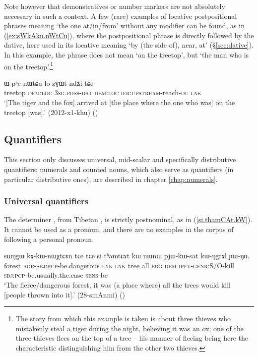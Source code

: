 Note however that demonstratives or number markers are not absolutely necessary in such a context. A few (rare) examples of locative postpositional phrases meaning `the one at/in/from' without any modifier can be found, as in (\ref{ex:sWkAku.nWtCu}), where the postpositional phrase is directly followed by the dative, here used in its locative meaning `by (the side of), near, at' (§\ref{sec:dative}). In this example, the phrase  does not mean `on the treetop', but `the man who is on the treetop'.\footnote{The story from which this example is taken is about three thieves who mistakenly steal a tiger during the night, believing it was an ox; one of the three thieves flees on the top of a tree -- his manner of fleeing being here the characteristic distinguishing him from the other two thieves.}

\begin{exe}
\ex \label{ex:sWkAku.nWtCu}
 ɯ-pʰe nɯtɕu lo-zɣɯt-ndʑi tɕe\\
treetop \textsc{dem}:\textsc{loc} \textsc{3sg}.\textsc{poss}-\textsc{dat} \textsc{dem}:\textsc{loc}  \textsc{ifr}:\textsc{upstream}-reach-\textsc{du} \textsc{lnk}\\
\glt `[The tiger and the fox] arrived at [the place where the one who was] on the treetop [was].' (2012-x1-khu)
()
\end{exe}

\subsection{Quantifiers} \label{sec:quantifiers.determiners}
This section only discusses universal, mid-scalar and specifically distributive quantifiers; numerals and counted nouns, which also serve as quantifiers (in particular distributive ones), are described in chapter \ref{chap:numerals}.

\subsubsection{Universal quantifiers} \label{sec:universal.quant}
The determiner , from Tibetan , is strictly postnominal, as in (\ref{si.thamCAt.kW}). It cannot be used as a pronoun, and there are no examples in the corpus of  following a personal pronoun.

\begin{exe}
\ex \label{si.thamCAt.kW}
 \gll   sɯŋgɯ kɤ-kɯ-nɯχtɕɤn tɕe tɕe si tʰamtɕɤt kɯ nɯnɯ pjɯ-kɯ-sat kɯ-ŋgrɤl ɲɯ-ŋu. \\
 forest \textsc{aor}-\textsc{sbj}:\textsc{pcp}-be.dangerous \textsc{lnk} \textsc{lnk} tree all \textsc{erg} \textsc{dem} \textsc{ipfv}-\textsc{genr}:S/O-kill  \textsc{sbj}:\textsc{pcp}-be.usually.the.case \textsc{sens}-be \\
 \glt `The fierce/dangerous forest, it was (a place where) all the trees would kill [people thrown into it].' (28-smAnmi)
()
\end{exe}
 
